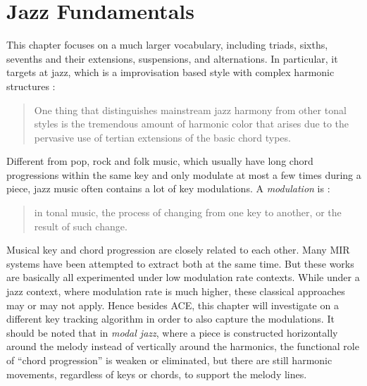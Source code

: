 \section{Jazz Fundamentals} \label{sec:5-jazzfund}
This chapter focuses on a much larger vocabulary, including triads, sixths, sevenths and their extensions, suspensions, and alternations. In particular, it targets at jazz, which is a improvisation based style with complex harmonic structures \cite{hojnackijazz}:
\begin{quote}
One thing that distinguishes mainstream jazz harmony from other tonal styles is the tremendous amount of harmonic color that arises due to the pervasive use of tertian extensions of the basic chord types.
\end{quote}
Different from pop, rock and folk music, which usually have long chord progressions within the same key and only modulate at most a few times during a piece, jazz music often contains a lot of key modulations. A {\it modulation} is \cite{randel1999harvard}:
\begin{quote}
in tonal music, the process of changing from one key to another, or the result of such change.
\end{quote}
Musical key and chord progression are closely related to each other. Many MIR systems \cite{catteau2007probabilistic,noland2009influences,mauch2010simultaneous,papadopoulos2012modeling} have been attempted to extract both at the same time. But these works are basically all experimented under low modulation rate contexts. While under a jazz context, where modulation rate is much higher, these classical approaches may or may not apply. Hence besides ACE, this chapter will investigate on a different key tracking algorithm in order to also capture the modulations. It should be noted that in {\it modal jazz}, where a piece is constructed horizontally around the melody instead of vertically around the harmonics, the functional role of ``chord progression'' is weaken or eliminated, but there are still harmonic movements, regardless of keys or chords, to support the melody lines.

